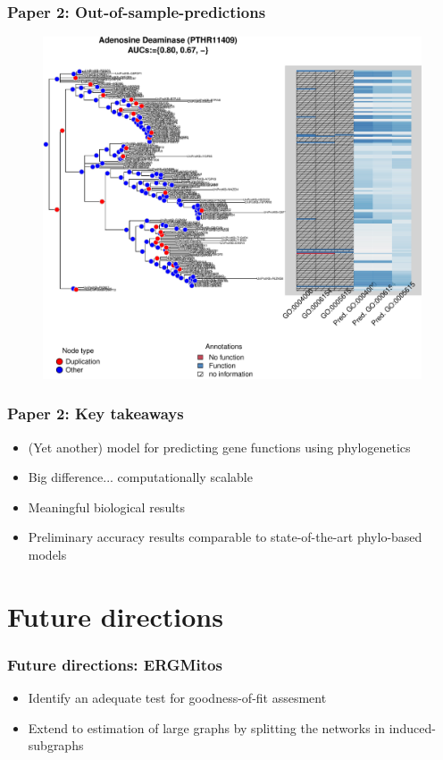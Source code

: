 \documentclass[aspectratio=169, 10pt]{beamer}
\begin{document}
\begin{frame}
\frametitle{Paper 2: Out-of-sample-predictions}

\begin{figure}
\centering
\includegraphics[width=.65\linewidth]{out-of-sample1-1.pdf}
\end{figure}

\end{frame}

\begin{frame}
\frametitle{Paper 2: Key takeaways}
\pause
\begin{itemize}
\item (Yet another) model for predicting gene functions using phylogenetics\pause
\item Big difference... computationally scalable\pause
\item Meaningful biological results\pause
\item Preliminary accuracy results comparable to state-of-the-art phylo-based
models
\end{itemize}
\end{frame}

\section{Future directions}
\begin{frame}
\frametitle{Future directions: ERGMitos}

\begin{itemize}
\item Identify an adequate test for goodness-of-fit assesment
\item Extend to estimation of large graphs by splitting the networks in induced-subgraphs
\end{itemize}

\end{frame}
\end{document}
